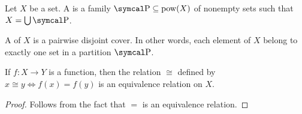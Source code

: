 \begin{definition}\label{def:set_partition}
  Let \( X \) be a set. A  is a family \( \CP \subseteq \Pow(X) \) of nonempty sets such that \( X = \bigcup \CP \).

  A  of \( X \) is a pairwise disjoint cover. In other words, each element of \( X \) belong to exactly one set in a partition \( \CP \).
\end{definition}

\begin{lemma}\label{thm:equivalence_relation_inheriance}
  If \( f: X \to Y \) is a function, then the relation \( \cong \) defined by \( x \cong y \iff f(x) = f(y) \) is an equivalence relation on \( X \).
\end{lemma}
\begin{proof}
  Follows from the fact that \( = \) is an equivalence relation.
\end{proof}

